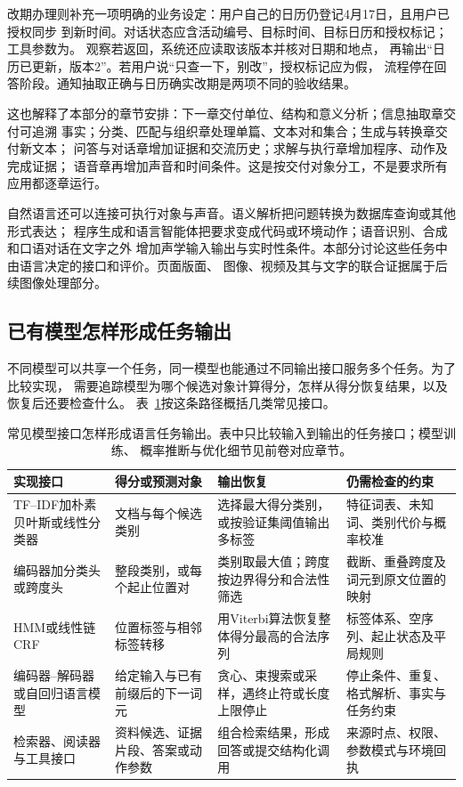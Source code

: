 改期办理则补充一项明确的业务设定：用户自己的日历仍登记4月17日，且用户已授权同步
到新时间。对话状态应含活动编号、目标时间、目标日历和授权标记；
工具参数为。
观察若返回，系统还应读取该版本并核对日期和地点，
再输出“日历已更新，版本2”。若用户说“只查一下，别改”，授权标记应为假，
流程停在回答阶段。通知抽取正确与日历确实改期是两项不同的验收结果。

这也解释了本部分的章节安排：下一章交付单位、结构和意义分析；信息抽取章交付可追溯
事实；分类、匹配与组织章处理单篇、文本对和集合；生成与转换章交付新文本；
问答与对话章增加证据和交流历史；求解与执行章增加程序、动作及完成证据；
语音章再增加声音和时间条件。这是按交付对象分工，不是要求所有应用都逐章运行。

自然语言还可以连接可执行对象与声音。语义解析把问题转换为数据库查询或其他形式表达；
程序生成和语言智能体把要求变成代码或环境动作；语音识别、合成和口语对话在文字之外
增加声学输入输出与实时性条件。本部分讨论这些任务中由语言决定的接口和评价。页面版面、
图像、视频及其与文字的联合证据属于后续图像处理部分。

\subsection{已有模型怎样形成任务输出}
\label{sec:nlp-model-output-interfaces}

不同模型可以共享一个任务，同一模型也能通过不同输出接口服务多个任务。为了比较实现，
需要追踪模型为哪个候选对象计算得分，怎样从得分恢复结果，以及恢复后还要检查什么。
表~\ref{tab:nlp-model-output-interfaces}按这条路径概括几类常见接口。

\begin{table}[htbp]
  \centering
  \begin{tabularx}{\linewidth}{@{}p{31mm}p{35mm}p{42mm}X@{}}
    \toprule
    实现接口 & 得分或预测对象 & 输出恢复 & 仍需检查的约束 \\
    \midrule
    TF--IDF加朴素贝叶斯或线性分类器
      & 文档与每个候选类别
      & 选择最大得分类别，或按验证集阈值输出多标签
      & 特征词表、未知词、类别代价与概率校准 \\
    编码器加分类头或跨度头
      & 整段类别，或每个起止位置对
      & 类别取最大值；跨度按边界得分和合法性筛选
      & 截断、重叠跨度及词元到原文位置的映射 \\
    HMM或线性链CRF
      & 位置标签与相邻标签转移
      & 用Viterbi算法恢复整体得分最高的合法序列
      & 标签体系、空序列、起止状态及平局规则 \\
    编码器--解码器或自回归语言模型
      & 给定输入与已有前缀后的下一词元
      & 贪心、束搜索或采样，遇终止符或长度上限停止
      & 停止条件、重复、格式解析、事实与任务约束 \\
    检索器、阅读器与工具接口
      & 资料候选、证据片段、答案或动作参数
      & 组合检索结果，形成回答或提交结构化调用
      & 来源时点、权限、参数模式与环境回执 \\
    \bottomrule
  \end{tabularx}
  \caption{常见模型接口怎样形成语言任务输出。表中只比较输入到输出的任务接口；模型训练、
  概率推断与优化细节见前卷对应章节。}
  \label{tab:nlp-model-output-interfaces}
\end{table}

